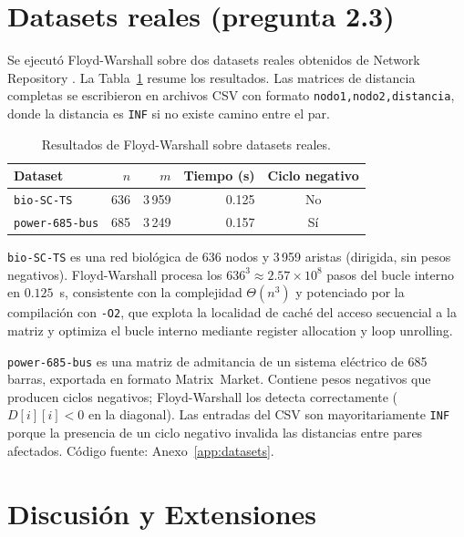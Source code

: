 \documentclass[11pt]{article}
\begin{document}
\pagebreak

\section{Datasets reales (pregunta 2.3)}
\label{sec:datasets}

Se ejecutó Floyd-Warshall sobre dos datasets reales obtenidos de
Network Repository \cite{networkrepository}. La Tabla~\ref{tab:datasets}
resume los resultados. Las matrices de distancia completas se escribieron en
archivos CSV con formato \texttt{nodo1,nodo2,distancia}, donde la distancia
es \texttt{INF} si no existe camino entre el par.

\begin{table}[ht]
\centering
\begin{tabular}{lrrrc}
\toprule
Dataset & $n$ & $m$ & Tiempo (s) & Ciclo negativo \\
\midrule
\texttt{bio-SC-TS} & 636 & 3\,959 & 0.125 & No \\
\texttt{power-685-bus} & 685 & 3\,249 & 0.157 & Sí \\
\bottomrule
\end{tabular}
\caption{Resultados de Floyd-Warshall sobre datasets reales.}
\label{tab:datasets}
\end{table}

\texttt{bio-SC-TS} es una red biológica de 636 nodos y 3\,959 aristas
(dirigida, sin pesos negativos). Floyd-Warshall procesa los
$636^3\approx 2.57\times 10^8$ pasos del bucle interno en $0.125$~s,
consistente con la complejidad $\Theta(n^3)$ y potenciado por la
compilación con \texttt{-O2}, que explota la localidad de caché del acceso
secuencial a la matriz y optimiza el bucle interno mediante register
allocation y loop unrolling.

\texttt{power-685-bus} es una matriz de admitancia de un sistema eléctrico
de 685 barras, exportada en formato Matrix~Market. Contiene pesos negativos
que producen ciclos negativos; Floyd-Warshall los detecta correctamente
($D[i][i]<0$ en la diagonal). Las entradas del CSV son mayoritariamente
\texttt{INF} porque la presencia de un ciclo negativo invalida las distancias
entre pares afectados. \linebreak
Código fuente: Anexo~\ref{app:datasets}.

\section{Discusión y Extensiones}
\label{sec:discusion}
\end{document}
